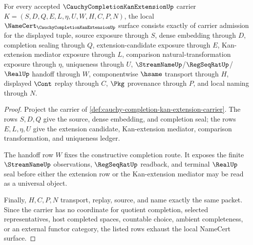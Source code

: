 \begin{theorem}
\label{thm:cauchy-completion-kan-extension-namecert-obligations}
For every accepted $\CauchyCompletionKanExtensionUp$ carrier $K=(S,D,Q,E,L,\eta,U,W,H,C,P,N)$, the local $\NameCert_{\CauchyCompletionKanExtensionUp}$ surface consists exactly of carrier admission for the displayed tuple, source exposure through $S$, dense embedding through $D$, completion sealing through $Q$, extension-candidate exposure through $E$, Kan-extension mediator exposure through $L$, comparison natural-transformation exposure through $\eta$, uniqueness through $U$, $\StreamNameUp$/$\RegSeqRatUp$/$\RealUp$ handoff through $W$, componentwise $\hsame$ transport through $H$, displayed $\Cont$ replay through $C$, $\Pkg$ provenance through $P$, and local naming through $N$.
\end{theorem}
\begin{proof}
Project the carrier of \autoref{def:cauchy-completion-kan-extension-carrier}. The rows $S,D,Q$ give the source, dense embedding, and completion seal; the rows $E,L,\eta,U$ give the extension candidate, Kan-extension mediator, comparison transformation, and uniqueness ledger.

The handoff row $W$ fixes the constructive completion route. It exposes the finite $\StreamNameUp$ observations, $\RegSeqRatUp$ readback, and terminal $\RealUp$ seal before either the extension row or the Kan-extension mediator may be read as a universal object.

Finally, $H,C,P,N$ transport, replay, source, and name exactly the same packet. Since the carrier has no coordinate for quotient completion, selected representatives, host completed spaces, countable choice, ambient completeness, or an external functor category, the listed rows exhaust the local NameCert surface.
\end{proof}

